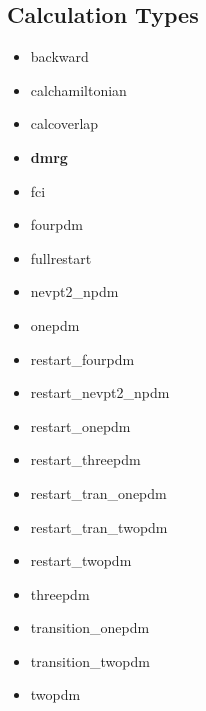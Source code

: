 \documentclass[letterpaper,10pt,english]{sphinxmanual}
\begin{document}
\subsection{Calculation Types}
\label{keywords:calculation-types}\begin{itemize}
\item {} 
backward

\item {} 
calchamiltonian

\item {} 
calcoverlap

\item {} 
\textbf{dmrg}

\item {} 
fci

\item {} 
fourpdm

\item {} 
fullrestart

\item {} 
nevpt2\_npdm

\item {} 
onepdm

\item {} 
restart\_fourpdm

\item {} 
restart\_nevpt2\_npdm

\item {} 
restart\_onepdm

\item {} 
restart\_threepdm

\item {} 
restart\_tran\_onepdm

\item {} 
restart\_tran\_twopdm

\item {} 
restart\_twopdm

\item {} 
threepdm

\item {} 
transition\_onepdm

\item {} 
transition\_twopdm

\item {} 
twopdm

\end{itemize}
\end{document}
